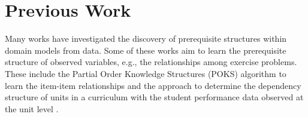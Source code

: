 \documentclass{edm_template}
\begin{document}
%


\section{Previous Work}
\label{sec:previous_work}
Many works have investigated the discovery of prerequisite structures within domain models from data.
Some of these works aim to learn the prerequisite structure of observed variables, e.g., the relationships among exercise problems.
These include the Partial Order Knowledge Structures (POKS) algorithm \cite{desmarais2006learned, pavlik2008using} to learn the item-item relationships
and the approach to determine the dependency structure of units in a curriculum with the student performance data observed at the unit level \cite{vuong2011method}.
  
\end{document}
